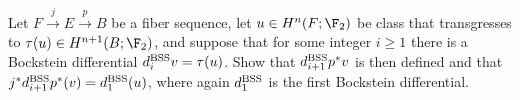 \begin{problem}
Let $F \xrightarrow{j} E \xrightarrow{p} B$ be a fiber sequence, let $u \in H^n(F; \F_2)$ be class that transgresses to $\tau(u) \in H^{n+1}(B; \F_2)$, and suppose that for some integer $i \ge 1$ there is a Bockstein differential $d^{\mathrm{BSS}}_i v = \tau(u)$.  Show that $d^{\mathrm{BSS}}_{i+1} p^* v$ is then defined and that $j^* d^{\mathrm{BSS}}_{i+1} p^*(v) = d^{\mathrm{BSS}}_1(u)$, where again $d^{\mathrm{BSS}}_1$ is the first Bockstein differential.
\end{problem}

